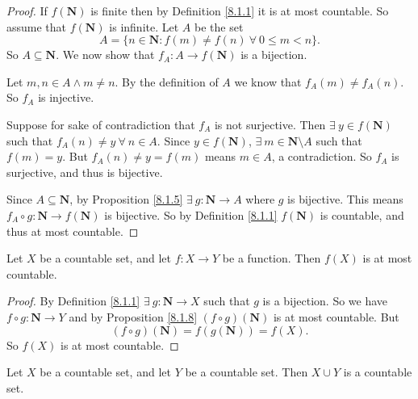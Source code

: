 \begin{proof}
    If \(f(\mathbf{N})\) is finite then by Definition \ref{8.1.1} it is at most countable.
    So assume that \(f(\mathbf{N})\) is infinite.
    Let \(A\) be the set
    \[
        A = \{n \in \mathbf{N} : f(m) \neq f(n) \ \forall\ 0 \leq m < n\}.
    \]
    So \(A \subseteq \mathbf{N}\).
    We now show that \(f_A : A \to f(\mathbf{N})\) is a bijection.

    Let \(m, n \in A \land m \neq n\).
    By the definition of \(A\) we know that \(f_A(m) \neq f_A(n)\).
    So \(f_A\) is injective.

    Suppose for sake of contradiction that \(f_A\) is not surjective.
    Then \(\exists\ y \in f(\mathbf{N})\) such that \(f_A(n) \neq y \ \forall\ n \in A\).
    Since \(y \in f(\mathbf{N})\), \(\exists\ m \in \mathbf{N} \setminus A\) such that \(f(m) = y\).
    But \(f_A(n) \neq y = f(m)\) means \(m \in A\), a contradiction.
    So \(f_A\) is surjective, and thus is bijective.

    Since \(A \subseteq \mathbf{N}\), by Proposition \ref{8.1.5} \(\exists\ g : \mathbf{N} \to A\) where \(g\) is bijective.
    This means \(f_A \circ g : \mathbf{N} \to f(\mathbf{N})\) is bijective.
    So by Definition \ref{8.1.1} \(f(\mathbf{N})\) is countable, and thus at most countable.
\end{proof}

\begin{corollary}\label{8.1.9}
    Let \(X\) be a countable set, and let \(f : X \to Y\) be a function.
    Then \(f(X)\) is at most countable.
\end{corollary}

\begin{proof}
    By Definition \ref{8.1.1} \(\exists\ g : \mathbf{N} \to X\) such that \(g\) is a bijection.
    So we have \(f \circ g : \mathbf{N} \to Y\) and by Proposition \ref{8.1.8} \((f \circ g)(\mathbf{N})\) is at most countable.
    But
    \[
        (f \circ g)(\mathbf{N}) = f(g(\mathbf{N})) = f(X).
    \]
    So \(f(X)\) is at most countable.
\end{proof}

\begin{proposition}\label{8.1.10}
    Let \(X\) be a countable set, and let \(Y\) be a countable set.
    Then \(X \cup Y\) is a countable set.
\end{proposition}

